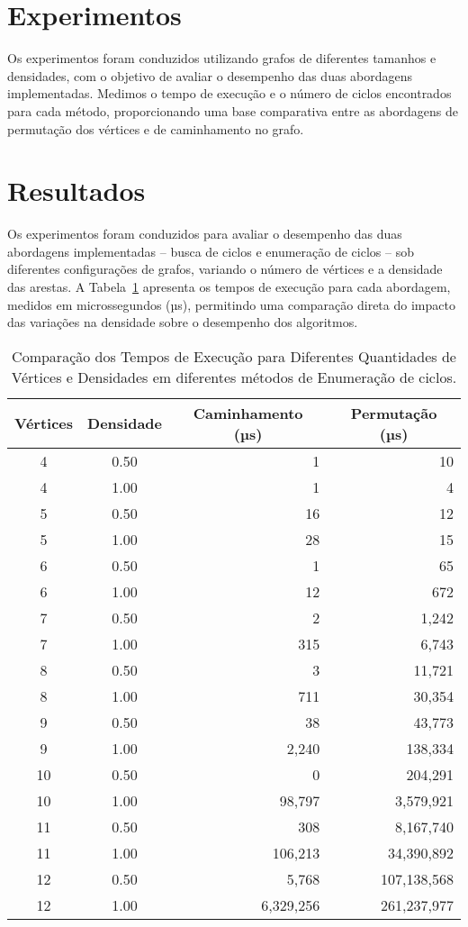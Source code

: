 \documentclass{article}
\begin{document}
\section{Experimentos}

Os experimentos foram conduzidos utilizando grafos de diferentes tamanhos e densidades, com o objetivo de avaliar o desempenho das duas abordagens implementadas. Medimos o tempo de execução e o número de ciclos encontrados para cada método, proporcionando uma base comparativa entre as abordagens de permutação dos vértices e de caminhamento no grafo.

\section{Resultados}

Os experimentos foram conduzidos para avaliar o desempenho das duas abordagens implementadas -- busca de ciclos e enumeração de ciclos -- sob diferentes configurações de grafos, variando o número de vértices e a densidade das arestas. A Tabela~\ref{table:execution_times} apresenta os tempos de execução para cada abordagem, medidos em microssegundos (µs), permitindo uma comparação direta do impacto das variações na densidade sobre o desempenho dos algoritmos.

\begin{table}[ht]
\centering
\begin{tabular}{|c|c|r|r|}
\hline
Vértices & Densidade & \multicolumn{1}{c|}{Caminhamento (µs)} & \multicolumn{1}{c|}{Permutação (µs)} \\
\hline
4 & 0.50 & 1 & 10 \\
4 & 1.00 & 1 & 4 \\
5 & 0.50 & 16 & 12 \\
5 & 1.00 & 28 & 15 \\
6 & 0.50 & 1 & 65 \\
6 & 1.00 & 12 & 672 \\
7 & 0.50 & 2 & 1,242 \\
7 & 1.00 & 315 & 6,743 \\
8 & 0.50 & 3 & 11,721 \\
8 & 1.00 & 711 & 30,354 \\
9 & 0.50 & 38 & 43,773 \\
9 & 1.00 & 2,240 & 138,334 \\
10 & 0.50 & 0 & 204,291 \\
10 & 1.00 & 98,797 & 3,579,921 \\
11 & 0.50 & 308 & 8,167,740 \\
11 & 1.00 & 106,213 & 34,390,892 \\
12 & 0.50 & 5,768 & 107,138,568 \\
12 & 1.00 & 6,329,256 & 261,237,977 \\
\hline
\end{tabular}
\caption{Comparação dos Tempos de Execução para Diferentes Quantidades de Vértices e Densidades em diferentes métodos de Enumeração de ciclos.}
\label{table:execution_times}
\end{table}
\end{document}
